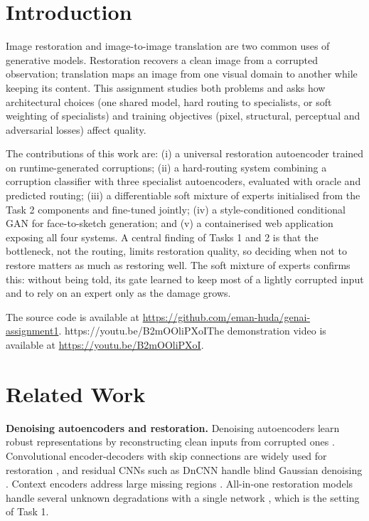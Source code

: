 \documentclass[conference]{IEEEtran}
\newcommand*{\videourl}{https://youtu.be/B2mOOliPXoI}
\newcommand{\videosentence}{\ifx\videourl\empty\else The demonstration video is available at \url{\videourl}.\fi}
\begin{document}
\section{Introduction}
Image restoration and image-to-image translation are two common uses of generative models. Restoration recovers a clean image from a corrupted observation; translation maps an image from one visual domain to another while keeping its content. This assignment studies both problems and asks how architectural choices (one shared model, hard routing to specialists, or soft weighting of specialists) and training objectives (pixel, structural, perceptual and adversarial losses) affect quality.

The contributions of this work are: (i) a universal restoration autoencoder trained on runtime-generated corruptions; (ii) a hard-routing system combining a corruption classifier with three specialist autoencoders, evaluated with oracle and predicted routing; (iii) a differentiable soft mixture of experts initialised from the Task 2 components and fine-tuned jointly; (iv) a style-conditioned conditional GAN for face-to-sketch generation; and (v) a containerised web application exposing all four systems. A central finding of Tasks 1 and 2 is that the bottleneck, not the routing, limits restoration quality, so deciding when not to restore matters as much as restoring well. The soft mixture of experts confirms this: without being told, its gate learned to keep most of a lightly corrupted input and to rely on an expert only as the damage grows.

The source code is available at \url{https://github.com/eman-huda/genai-assignment1}. \videosentence

\section{Related Work}
\textbf{Denoising autoencoders and restoration.} Denoising autoencoders learn robust representations by reconstructing clean inputs from corrupted ones \cite{vincent2008}. Convolutional encoder-decoders with skip connections are widely used for restoration \cite{mao2016}, and residual CNNs such as DnCNN handle blind Gaussian denoising \cite{zhang2017dncnn}. Context encoders address large missing regions \cite{pathak2016}. All-in-one restoration models handle several unknown degradations with a single network \cite{li2022airnet}, which is the setting of Task 1.
\end{document}

